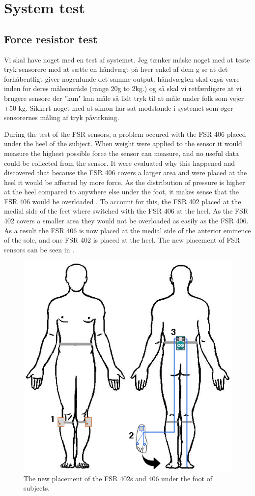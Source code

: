 \section{System test}

\subsection{Force resistor test}
Vi skal have noget med en test af systemet. Jeg tænker måske noget med at teste tryk sensorere med at sætte en håndvægt på hver enkel af dem g se at det forhåbentligt giver nogenlunde det samme output. håndvægten skal også være inden for deres måleområde (range 20g to 2kg.) og så skal vi retfærdigøre at vi brugere sensore der "kun" kan måle så lidt tryk til at måle under folk som vejer +50 kg. Sikkert noget med at simon har sat modstande i systemet som øger sensorernes måling af tryk påvirkning. 


During the test of the FSR sensors, a problem occured with the FSR 406 placed under the heel of the subject. When weight were applied to the sensor it would measure the highest possible force the sensor can measure, and no useful data could be collected from the sensor. It were evaluated why this happened and discovered that because the FSR 406 covers a larger area and were placed at the heel it would be affected by more force. As the distribution of pressure is higher at the heel compared to anywhere else under the foot, it makes sense that the FSR 406 would be overloaded \cite{Hessert2005}. To account for this, the FSR 402 placed at the medial side of the feet where switched with the FSR 406 at the heel. As the FSR 402 covers a smaller area they would not be overloaded as easily as the FSR 406. As a result the FSR 406 is now placed at the medial side of the anterior eminence of the sole, and one FSR 402 is placed at the heel. The new placement of FSR sensors can be seen in .

\begin{figure}[H]
	\includegraphics[width=.6\textwidth]{figures/bodySysSetup}
	\caption{The new placement of the FSR 402s and 406 under the foot of subjects.}
	\label{fig:soleSensorPlacement}  %
\end{figure}



